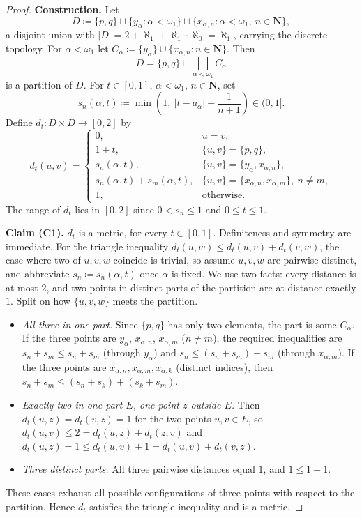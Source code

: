 \documentclass[12pt]{article}
\theoremstyle{definition}
\begin{document}
\begin{proof}
  \noindent\textbf{Construction.} Let
  \[
    D \coloneqq \{p,q\} \sqcup \{y_\alpha : \alpha<\omega_1\} \sqcup
    \{x_{\alpha,n} : \alpha < \omega_1,\ n \in \mathbf{N}\},
  \]
  a disjoint union with $\lvert D\rvert = 2 + \aleph_1 + \aleph_1\cdot
  \aleph_0 = \aleph_1$, carrying the discrete topology. For $\alpha <
  \omega_1$ let $C_\alpha \coloneqq \{y_\alpha\} \cup \{x_{\alpha,n} :
  n\in\mathbf{N}\}$. Then
  \[
    D = \{p,q\} \sqcup \bigsqcup_{\alpha<\omega_1} C_\alpha
  \]
  is a partition of $D$. For $t \in [0,1]$, $\alpha < \omega_1$,
  $n \in \mathbf{N}$, set
  \[
    s_n(\alpha,t) \coloneqq \min\left(1,\ \lvert t-a_\alpha\rvert +
    \dfrac{1}{n+1}\right)
    \in (0,1].
  \]
  Define $d_t \colon D\times D\to[0,2]$ by
  \[
    d_t(u,v)=
    \begin{cases}
      0, & u=v,\\
      1+t, & \{u,v\}=\{p,q\},\\
      s_n(\alpha,t), & \{u,v\}=\{y_\alpha,x_{\alpha,n}\},\\
      s_n(\alpha,t)+s_m(\alpha,t),
      & \{u,v\}=\{x_{\alpha,n},x_{\alpha,m}\},\ n\ne m,\\
      1, & \text{otherwise}.
    \end{cases}
  \]
  The range of $d_t$ lies in $[0,2]$ since $0 < s_n \le 1$ and $0\le t\le 1$.

  \medskip\noindent\textbf{Claim (C1).} $d_t$ is a metric, for every $t \in [0,1]$.
  Definiteness and symmetry are immediate. For the triangle inequality
  $d_t(u,w)\le d_t(u,v)+d_t(v,w)$, the case where two of $u,v,w$ coincide is
  trivial, so assume $u,v,w$ are pairwise distinct, and abbreviate $s_n \coloneqq
  s_n(\alpha,t)$ once $\alpha$ is fixed. We use two facts: every distance is
  at most $2$, and two points in distinct parts of the partition are at distance
  exactly $1$. Split on how $\{u,v,w\}$ meets the partition.

  \begin{itemize}
  \item \emph{All three in one part.} Since $\{p,q\}$ has only two
    elements, the part is some $C_\alpha$. If the three points are
    $y_\alpha$, $x_{\alpha,n}$, $x_{\alpha,m}$ ($n \ne m$), the required
    inequalities are $s_n+s_m \le s_n + s_m$ (through $y_\alpha$) and
    $s_n \le (s_n+s_m) + s_m$ (through $x_{\alpha,m}$). If the three points
    are $x_{\alpha,n},x_{\alpha,m},x_{\alpha,k}$ (distinct indices), then
    $s_n+s_m \le (s_n+s_k) + (s_k+s_m)$.
  \item \emph{Exactly two in one part $E$, one point $z$ outside $E$.} Then
    $d_t(u,z)=d_t(v,z)=1$ for the two points $u,v \in E$, so
    $d_t(u,v)\le 2 = d_t(u,z)+d_t(z,v)$ and $d_t(u,z)=1\le d_t(u,v)+1 =
    d_t(u,v)+d_t(v,z)$.
  \item \emph{Three distinct parts.} All three pairwise distances equal
    $1$, and $1\le 1+1$.
  \end{itemize}
  These cases exhaust all possible configurations of three points with respect
  to the partition. Hence $d_t$ satisfies the triangle inequality and is a metric.


\end{proof}
\end{document}
